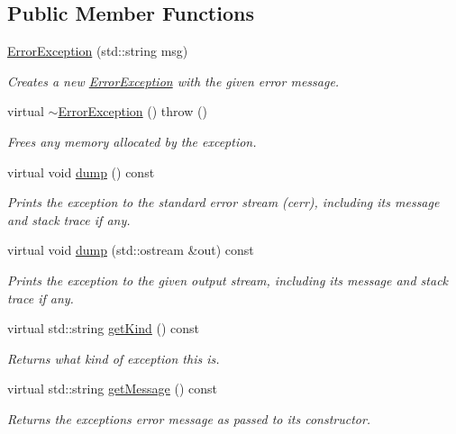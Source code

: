 \subsection*{Public Member Functions}
\begin{DoxyCompactItemize}
\item 
\mbox{\hyperlink{classErrorException_a4f422b01fff7cc16eea81e00638f44d2}{Error\+Exception}} (std\+::string msg)
\begin{DoxyCompactList}\small\item\em Creates a new \mbox{\hyperlink{classErrorException}{Error\+Exception}} with the given error message. \end{DoxyCompactList}\item 
virtual \mbox{\hyperlink{classErrorException_a8a69609bdba32e156392e54dadadcb18}{$\sim$\+Error\+Exception}} ()  throw ()
\begin{DoxyCompactList}\small\item\em Frees any memory allocated by the exception. \end{DoxyCompactList}\item 
virtual void \mbox{\hyperlink{classErrorException_af1e6a5fb477a95a876e86ceadf065ffd}{dump}} () const
\begin{DoxyCompactList}\small\item\em Prints the exception to the standard error stream (cerr), including its message and stack trace if any. \end{DoxyCompactList}\item 
virtual void \mbox{\hyperlink{classErrorException_a277bc85222ba9a7d0fd47fd10d44d115}{dump}} (std\+::ostream \&out) const
\begin{DoxyCompactList}\small\item\em Prints the exception to the given output stream, including its message and stack trace if any. \end{DoxyCompactList}\item 
virtual std\+::string \mbox{\hyperlink{classErrorException_ae6faf7d90a6394517c0328748c99ec1d}{get\+Kind}} () const
\begin{DoxyCompactList}\small\item\em Returns what kind of exception this is. \end{DoxyCompactList}\item 
virtual std\+::string \mbox{\hyperlink{classErrorException_a1c1cc72e6e4257dbd29ff04a23973008}{get\+Message}} () const
\begin{DoxyCompactList}\small\item\em Returns the exception\textquotesingle{}s error message as passed to its constructor. \end{DoxyCompactList}\item 

\end{DoxyCompactItemize}
